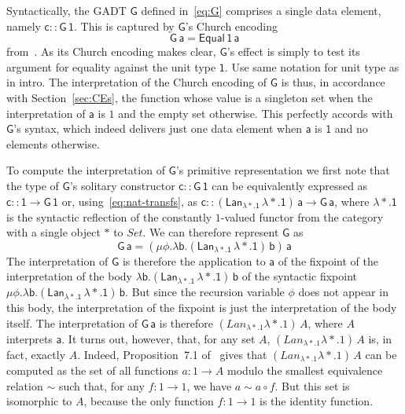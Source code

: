 \documentclass[acmsmall,screen,review,anonymous]{acmart}
\theoremstyle{definition}
\newcommand{\set}{\mathsf{Set}}
\begin{document}
\begin{example}\label{ex:g1}
Syntactically, the GADT $\mathsf{G}$ defined in~\eqref{eq:G} comprises
a single data element, namely $\mathsf{c :: G \, 1}$. This is captured
by $\mathsf{G}$'s Church encoding
\[\mathsf{G\,a} = \mathsf{Equal\,1\,a}\]
from~\cite{atk12}. As its Church encoding makes clear, $\mathsf{G}$'s
effect is simply to test its argument for equality against the unit
type $\mathsf{1}$. {\color{blue} Use same notation for unit type as in
  intro.} The interpretation of the Church encoding of $\mathsf{G}$
is thus, in accordance with Section~\ref{sec:CEs}, the function whose
value is a singleton set when the interpretation of $\mathsf{a}$ is
$1$ and the empty set otherwise. This perfectly accords with
$\mathsf{G}$'s syntax, which indeed delivers just one data element
when $\mathsf{a}$ is $\mathsf{1}$ and no elements otherwise.

To compute the interpretation of $\mathsf{G}$'s primitive
representation we first note that the type of $\mathsf{G}$'s solitary
constructor $\mathsf{c :: G\,1}$ can be equivalently expressed as
$\mathsf{c :: 1 \to G\,1}$ or, using~\eqref{eq:nat-transfs}, as
$\mathsf{c :: (Lan_{\lambda *. 1}\,\lambda *. 1)\,a \to G\, a}$, where
$\mathsf{\lambda *. 1}$ is the syntactic reflection of the constantly
$1$-valued functor from the category with a single object $*$ to
$\mathit{Set}$. We can therefore represent $\mathsf{G}$ as
\[\mathsf{G\,a} = \mathsf{(\mu \phi. \lambda b.
 (Lan_{\lambda *. 1} \,\lambda *.  1)\,b)\,a}\] The interpretation of
$\mathsf{G}$ is therefore the application to $\mathsf{a}$ of the
fixpoint of the interpretation of the body $\mathsf{\lambda
  b. (Lan_{\lambda *. 1} \,\lambda *. 1)\,b}$ of the syntactic
fixpoint $\mathsf{\mu \phi. \lambda b.  (Lan_{\lambda *. 1} \,\lambda
  *.  1)\,b}$. But since the recursion variable $\mathsf{\phi}$ does
not appear in this body, the interpretation of the fixpoint is just
the interpretation of the body itself.  The interpretation of
$\mathsf{G\,a}$ is therefore $(\mathit{Lan}_{\lambda *. 1} \lambda
*. 1)\, A$, where $A$ interprets $\mathsf{a}$.
It turns out, however, that, for any set $A$, $(\mathit{Lan}_{\lambda
  *. 1} \lambda *. 1)\,A$ is, in fact, exactly $A$. Indeed,
Proposition~7.1 of~\cite{blw03} gives that $(\mathit{Lan}_{\lambda
  *. 1} \lambda *. 1)\,A$ can be computed as the set of all functions
$a : 1 \to A$ modulo the smallest equivalence relation $\sim$ such
that, for any $f : 1 \to 1$, we have $a \sim a \circ f$.  But this set
is isomorphic to $A$, because the only function $f : 1 \to 1$ is the
identity function.



\end{example}
\end{document}
